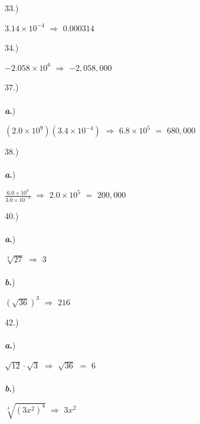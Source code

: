 \documentclass[12pt]{article}
\begin{document}
{\setlength{\parindent}{0cm}
33.) 
    \begin{center} $3.14\times10^{-4}$ $\Longrightarrow$ $0.000314$ \end{center}
}
{\setlength{\parindent}{0cm}
34.) 
    \begin{center} $-2.058\times10^6$ $\Longrightarrow$ $-2,058,000$ \end{center}
}
{\setlength{\parindent}{0cm}
37.) 
    \paragraph{} \textbf{\textit{a}.})
        \begin{center} $(2.0\times10^9)(3.4\times10^{-4})$ $\Longrightarrow$ $6.8\times10^5$ $=$ $680,000$ \end{center}
}
{\setlength{\parindent}{0cm}
38.) 
    \paragraph{} \textbf{\textit{a}.})
        \begin{center} $\frac{6.0\times10^8}{3.0\times10^{-3}}$ $\Longrightarrow$ $2.0\times10^5$ $=$ $200,000$ \end{center}
}
{\setlength{\parindent}{0cm}
40.) 
    \paragraph{} \textbf{\textit{a}.})
        \begin{center} $\sqrt[3]{27}$ $\Longrightarrow$ $3$ \end{center} 
    \paragraph{} \textbf{\textit{b}.})
        \begin{center} $(\sqrt{36})^3$ $\Longrightarrow$ $216$ \end{center} 
}
{\setlength{\parindent}{0cm}
42.) 
    \paragraph{} \textbf{\textit{a}.})
        \begin{center} $\sqrt{12}\cdot\sqrt{3}$ $\Longrightarrow$ $\sqrt{36}$ $=$ $6$ \end{center} 
    \paragraph{} \textbf{\textit{b}.})
        \begin{center} $\sqrt[4]{(3x^2)^4}$ $\Longrightarrow$ $3x^2$ \end{center} 
}
\end{document}
